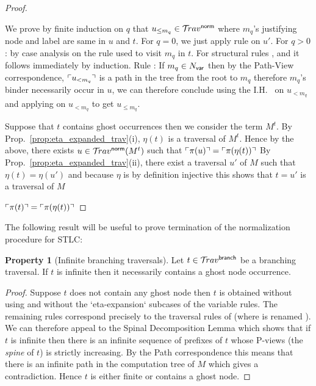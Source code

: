 \documentclass{article}
\theoremstyle{definition}
\newtheorem{property}{Property}[section]
\newcommand\Nodes{N}%
\newcommand\NodesVar{N_{\sf var}}%
\newcommand{\ghostlmd}{{\lambda\!\!\lambda}}
\newcommand{\normalizing}{{\sf norm}}
\newcommand{\branching}{{\sf branch}}
\newcommand{\travsetbr}{{\travset^\branching}}
\newcommand{\travsetnorm}{\travset^\normalizing}
\def\coresymbol{\pi} %
\newcommand{\core}[1]{\coresymbol(#1)} %
\newcommand{\enables}{\vdash} %
\newcommand{\NodeHjByRoot}{\Nodes^{\enables^*}} %
\begin{document}
\begin{proof}
\begin{itemize}
We prove by finite induction on $q$ that $u_{\leq m_q} \in\travsetnorm$ where $m_q$'s justifying node and label are same in $u$ and $t$. For $q=0$, we just apply rule  on $u'$.
For $q>0$: by case analysis on the rule used to visit $m_q$ in $t$.
For structural rules ,  and  it follows immediately by induction.
Rule : If $m_q \in \NodesVar$ then by the Path-View correspondence, $\ulcorner u_{<m_q} \urcorner$ is a path in the tree from the root to $m_q$ therefore $m_q$'s binder necessarily occur in $u$, we can therefore conclude using the I.H.~ on $u_{<m_q}$ and applying  on $u_{<m_q}$ to get $u_{\leq m_q}$.


\end{itemize}
Suppose that $t$ contains ghost occurrences then we consider the term $M^t$.
By Prop.~\ref{prop:eta_expanded_trav}(i), $\eta(t)$ is a traversal of $M^t$. Hence by the above, there exists $u\in\travsetnorm(M^t)$ such that
$\pview{\core{u}}=\pview{\core{\eta(t)}}$
By Prop.~\ref{prop:eta_expanded_trav}(ii),
there exist a traversal $u'$ of $M$ such that $\eta(t) = \eta(u')$ and because $\eta$ is by definition injective this shows that $t=u'$ is a traversal of $M$

$\pview{\core{t}}=\pview{\core{\eta(t)}}$
\end{proof}

The following result will be useful to prove termination of the normalization procedure for STLC:
\begin{property}[Infinite branching traversals]
\label{prop:branching_spine_property}
Let $t\in \travsetbr$ be a branching traversal. If $t$ is infinite then it necessarily contains a ghost node occurrence.
\end{property}
\begin{proof}
Suppose $t$ does not contain any ghost node then
$t$ is obtained without using \rulenamet{Lam^\ghostlmd_\branching} and without the `eta-expansion` subcases of the variable rules. The remaining rules correspond precisely to the traversal rules of
\cite{Ong2006} (where  is renamed ).
We can therefore appeal to the Spinal Decomposition Lemma
\cite[Lemma 14]{Ong2006} which shows that if $t$ is infinite then there is an infinite sequence of prefixes of $t$ whose P-views (the \emph{spine} of $t$) is strictly increasing. By the Path correspondence this means that there is an infinite path in the computation tree of $M$ which gives a contradiction. Hence $t$ is either finite or contains a ghost node.
\end{proof}
\end{document}

